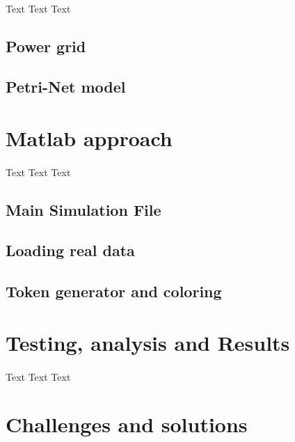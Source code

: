 \documentclass[a4paper]{article}
\begin{document}
\paragraph{}
Text Text Text

\subsection{Power grid}
\subsection{Petri-Net model}

%
\section{Matlab approach}

\paragraph{}
Text Text Text

\subsection{Main Simulation File}
\subsection{Loading real data}
\subsection{Token generator and coloring}

%                                      
\section{Testing, analysis and Results}   

\paragraph{}
Text Text Text

%
\section{Challenges and solutions}    
\end{document}
